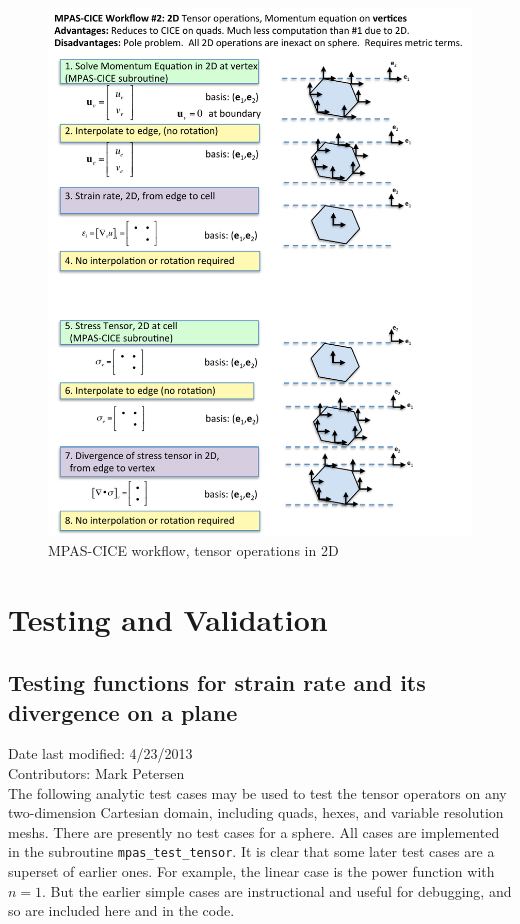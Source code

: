 \documentclass[11pt]{report}
\begin{document}
\begin{figure}[htbp]
 \center
 \includegraphics[scale=0.9]{f/mpasCICE_tensor_workflow2.pdf}
 \caption{MPAS-CICE workflow, tensor operations in 2D}
 \label{fig:mpasCICE_tensor_workflow2}
\end{figure}



\chapter{Testing and Validation}

\section{Testing functions for strain rate and its divergence on a plane}
Date last modified: 4/23/2013 \\
Contributors: Mark Petersen \\

The following analytic test cases may be used to test the tensor operators on any two-dimension Cartesian domain, including quads, hexes, and variable resolution meshs.  There are presently no test cases for a sphere.  All cases are implemented in the subroutine \verb|mpas_test_tensor|.  It is clear that some later test cases are a superset of earlier ones.  For example, the linear case is the power function with $n=1$.  But the earlier simple cases are instructional and useful for debugging, and so are included here and in the code.
\end{document}
